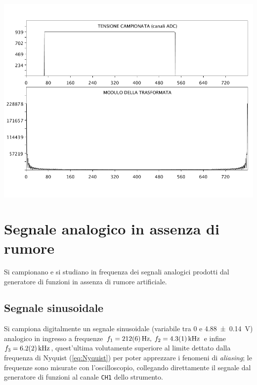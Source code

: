 \documentclass[10pt,oneside,a4paper]{article}
\newenvironment{Figure}
  {\par\medskip\noindent\minipage{\linewidth}}
  {\endminipage\par\medskip}
\begin{document}
\begin{multicols}{2}
\begin{Figure}
	\begin{center}
	\includegraphics[width=\linewidth]{verifica}
	\label{fig:verifiche_ADC}
	\end{center}
\end{Figure}


\section{Segnale analogico in assenza di rumore}
Si campionano e si studiano in frequenza dei segnali analogici prodotti dal generatore di funzioni in assenza di rumore artificiale.
\subsection{Segnale sinusoidale}
Si campiona digitalmente un segnale sinusoidale (variabile tra $0$ e \SI{4.88 \pm 0.14}{V}) analogico in ingresso a frequenze $f_1 = \SI{212 \pm 6}{\hertz}, \; f_2 = \SI{4.3 \pm 0.1}{\kilo\hertz}$ e infine $f_3 = \SI{6.2 \pm 0.2}{\kilo\hertz}$, quest'ultima volutamente superiore al limite dettato dalla frequenza di Nyquist (\ref{eq:Nyquist}) per poter apprezzare i fenomeni di \emph{aliasing}; le frequenze sono misurate con l'oscilloscopio, collegando direttamente il segnale dal generatore di funzioni al canale \texttt{CH1} dello strumento.


\end{multicols}
\end{document}
